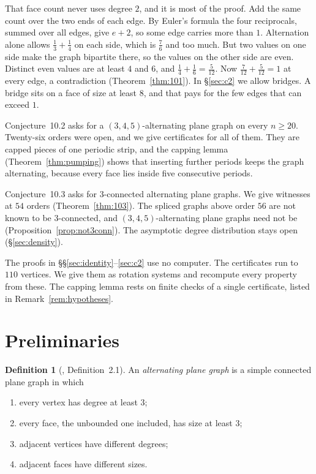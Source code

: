\documentclass[11pt,a4paper]{amsart}
\theoremstyle{plain}
\theoremstyle{definition}
\newtheorem{definition}[theorem]{Definition}
\begin{document}
That face count never uses degree $2$, and it is most of the proof. Add the same
count over the two ends of each edge. By Euler's formula the four reciprocals,
summed over all edges, give $e+2$, so some edge carries more than $1$. Alternation alone allows
$\frac13+\frac14$ on each side, which is $\frac76$ and too much. But two
values on one side make the graph bipartite there, so the values on the other
side are even. Distinct even values are at least $4$ and $6$, and
$\frac14+\frac16=\frac5{12}$. Now $\frac7{12}+\frac5{12}=1$ at every edge, a
contradiction (Theorem~\ref{thm:101}). In \S\ref{sec:c2} we allow bridges. A
bridge sits on a face of size at least $8$, and that pays for the few edges that
can exceed $1$.

Conjecture~10.2 asks for a $(3,4,5)$-alternating plane graph on every
$n \ge 20$. Twenty-six orders were open, and we give certificates for all of
them. They are capped pieces of one periodic strip, and the capping lemma
(Theorem~\ref{thm:pumping}) shows that inserting further periods keeps the graph
alternating, because every face lies inside five consecutive periods.

Conjecture~10.3 asks for $3$-connected alternating plane graphs. We give
witnesses at $54$ orders (Theorem~\ref{thm:103}). The spliced graphs above
order $56$ are not known to be $3$-connected, and $(3,4,5)$-alternating plane
graphs need not be (Proposition~\ref{prop:not3conn}). The asymptotic degree
distribution stays open (\S\ref{sec:density}).

The proofs in \S\S\ref{sec:identity}--\ref{sec:c2} use no computer. The
certificates run to $110$ vertices. We give them as rotation systems and
recompute every property from these. The capping lemma rests on finite checks
of a single certificate, listed in Remark~\ref{rem:hypotheses}.

\section{Preliminaries}\label{sec:prelim}

\begin{definition}[\cite{AHSSV2015}, Definition~2.1]\label{def:apg}
An \emph{alternating plane graph} is a simple connected plane graph in
which
\begin{enumerate}
  \item[(a)] every vertex has degree at least $3$;
  \item[(b)] every face, the unbounded one included, has size at least $3$;
  \item[(c)] adjacent vertices have different degrees;
  \item[(d)] adjacent faces have different sizes.
\end{enumerate}
\end{definition}
\end{document}
